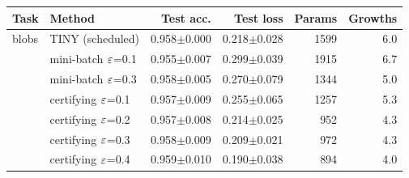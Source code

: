 \begin{tabular}{llrrrr}
\toprule
Task & Method & Test acc. & Test loss & Params & Growths \\
\midrule
blobs & TINY (scheduled) & 0.958$\pm$0.000 & 0.218$\pm$0.028 & 1599 & 6.0 \\
 & mini-batch $\varepsilon$=0.1 & 0.955$\pm$0.007 & 0.299$\pm$0.039 & 1915 & 6.7 \\
 & mini-batch $\varepsilon$=0.3 & 0.958$\pm$0.005 & 0.270$\pm$0.079 & 1344 & 5.0 \\
 & certifying $\varepsilon$=0.1 & 0.957$\pm$0.009 & 0.255$\pm$0.065 & 1257 & 5.3 \\
 & certifying $\varepsilon$=0.2 & 0.957$\pm$0.008 & 0.214$\pm$0.025 & 952 & 4.3 \\
 & certifying $\varepsilon$=0.3 & 0.958$\pm$0.009 & 0.209$\pm$0.021 & 972 & 4.3 \\
 & certifying $\varepsilon$=0.4 & 0.959$\pm$0.010 & 0.190$\pm$0.038 & 894 & 4.0 \\
\bottomrule
\end{tabular}